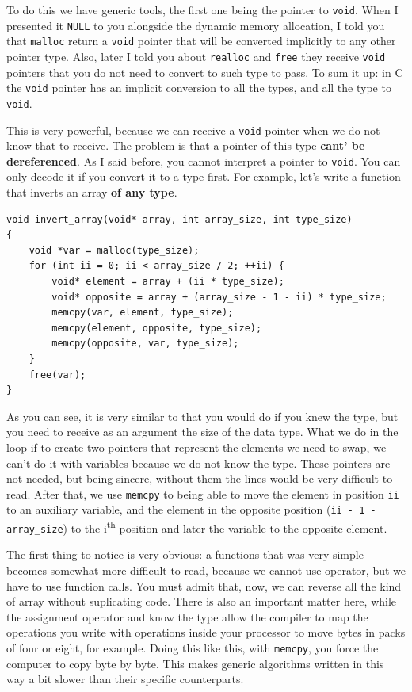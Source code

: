 \documentclass[a4paper]{article}
\begin{document}
To do this we have generic tools, the first one being the pointer to
\verb!void!. When I presented it \verb!NULL! to you alongside the dynamic memory
allocation, I told you that \verb!malloc! return a \verb!void! pointer that will
be converted implicitly to any other pointer type. Also, later I told you about
\verb!realloc! and \verb!free! they receive \verb!void! pointers that you do not
need to convert to such type to pass. To sum it up: in C the \verb!void! pointer
has an implicit conversion to all the types, and all the type to \verb!void!.

This is very powerful, because we can receive a \verb!void! pointer when we do
not know that to receive. The problem is that a pointer of this type \textbf{
cant' be dereferenced}. As I said before, you cannot interpret a pointer to
\verb!void!. You can only decode it if you convert it to a type first. For
example, let's write a function that inverts an array \textbf{of any type}.

\noindent
\begin{minipage}[H]{\linewidth}
\mbox{}
\begin{lstlisting}[style=C,
caption={Inversion of an array of any type},
label={lst:genericArrayInversion}]
void invert_array(void* array, int array_size, int type_size)
{
    void *var = malloc(type_size);
    for (int ii = 0; ii < array_size / 2; ++ii) {
        void* element = array + (ii * type_size);
        void* opposite = array + (array_size - 1 - ii) * type_size;
        memcpy(var, element, type_size);
        memcpy(element, opposite, type_size);
        memcpy(opposite, var, type_size);
    }
    free(var);
}
\end{lstlisting}
\end{minipage}

As you can see, it is very similar to that you would do if you knew the type,
but you need to receive as an argument the size of the data type. What we do in
the loop if to create two pointers that represent the elements we need to swap,
we can't do it with variables because we do not know the type. These pointers
are not needed, but being sincere, without them the lines would be very
difficult to read. After that, we use \verb!memcpy! to being able to move the
element in position \verb!ii! to an auxiliary variable, and the element in the
opposite position (\verb!ii - 1 - array_size!) to the i\textsuperscript{th}
position and later the variable to the opposite element.

The first thing to notice is very obvious: a functions that was very simple
becomes somewhat more difficult to read, because we cannot use operator, but we
have to use function calls. You must admit that, now, we can reverse all the
kind of array without suplicating code. There is also an important matter here,
while the assignment operator and know the type allow the compiler to map the
operations you write with operations inside your processor to move bytes
in packs of four or eight, for example. Doing this like this, with
\verb!memcpy!, you force the computer to copy byte by byte. This makes generic
algorithms written in this way a bit slower than their specific counterparts.
\end{document}
